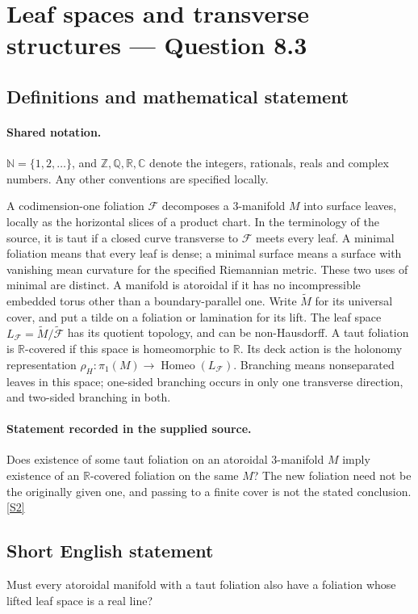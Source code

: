 \documentclass[11pt]{article}
\newcommand{\sref}[2]{\hyperlink{source:#1:#2}{[S#2]}}
\begin{document}
\section{Leaf spaces and transverse structures — Question 8.3}\label{statement}

\subsection{Definitions and mathematical statement}

\paragraph{Shared notation.}$\mathbb N=\{1,2,\ldots\}$, and $\mathbb Z,\mathbb Q,\mathbb R,\mathbb C$ denote the integers, rationals, reals and complex numbers. Any other conventions are specified locally.


A codimension-one foliation $\mathcal F$ decomposes a $3$-manifold $M$ into surface leaves, locally as the horizontal slices of a product chart. In the terminology of the source, it is taut if a closed curve transverse to $\mathcal F$ meets every leaf. A minimal foliation means that every leaf is dense; a minimal surface means a surface with vanishing mean curvature for the specified Riemannian metric. These two uses of minimal are distinct. A manifold is atoroidal if it has no incompressible embedded torus other than a boundary-parallel one. Write $\widetilde M$ for its universal cover, and put a tilde on a foliation or lamination for its lift. The leaf space $L_{\mathcal F}=\widetilde M/\widetilde{\mathcal F}$ has its quotient topology, and can be non-Hausdorff. A taut foliation is $\mathbb R$-covered if this space is homeomorphic to $\mathbb R$. Its deck action is the holonomy representation $\rho_H:\pi_1(M)\longrightarrow\operatorname{Homeo}(L_{\mathcal F})$. Branching means nonseparated leaves in this space; one-sided branching occurs in only one transverse direction, and two-sided branching in both.
\paragraph{Statement recorded in the supplied source.}
Does existence of some taut foliation on an atoroidal $3$-manifold $M$ imply existence of an $\mathbb R$-covered foliation on the same $M$? The new foliation need not be the originally given one, and passing to a finite cover is not the stated conclusion. \sref{statement}{2}
\subsection{Short English statement}
Must every atoroidal manifold with a taut foliation also have a foliation whose lifted leaf space is a real line?
\end{document}

